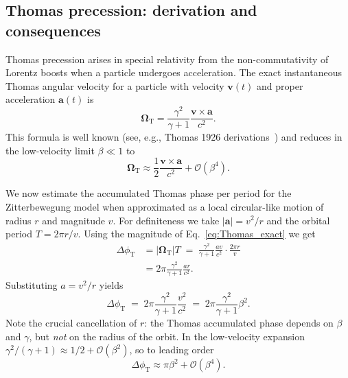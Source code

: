 \documentclass[%
 reprint,
 amsmath,amssymb,
 aps,
]{revtex4-1}
\numberwithin{equation}{section}
\begin{document}
\subsection{Thomas precession: derivation and consequences}

Thomas precession arises in special relativity from the non-commutativity of Lorentz boosts when a particle undergoes acceleration. The exact instantaneous Thomas angular velocity for a particle with velocity $\mathbf{v}(t)$ and proper acceleration $\mathbf{a}(t)$ is
\begin{equation}
\boldsymbol{\Omega}_{\mathrm{T}} = \frac{\gamma^{2}}{\gamma+1}\frac{\mathbf{v}\times\mathbf{a}}{c^{2}}.
\label{eq:Thomas_exact}
\end{equation}
This formula is well known (see, e.g., Thomas 1926 derivations~\cite{thomas1926}) and reduces in the low-velocity limit $\beta\ll1$ to
\begin{equation}
\boldsymbol{\Omega}_{\mathrm{T}}\approx \frac{1}{2}\frac{\mathbf{v}\times\mathbf{a}}{c^{2}}+\mathcal{O}(\beta^{4}).
\label{eq:Thomas_low}
\end{equation}

We now estimate the accumulated Thomas phase per period for the Zitterbewegung model when approximated as a local circular-like motion of radius $r$ and magnitude $v$. For definiteness we take $|\mathbf{a}|=v^{2}/r$ and the orbital period $T=2\pi r/v$. Using the magnitude of Eq.~\eqref{eq:Thomas_exact} we get
\begin{align}
\Delta\phi_{\mathrm{T}} &= \left|\boldsymbol{\Omega}_{\mathrm{T}}\right| T
\;=\; \frac{\gamma^{2}}{\gamma+1}\frac{a v}{c^{2}}\cdot\frac{2\pi r}{v}
\nonumber\\
&= 2\pi\frac{\gamma^{2}}{\gamma+1}\frac{a r}{c^{2}}.
\label{eq:DeltaPhiT_general}
\end{align}
Substituting $a=v^{2}/r$ yields
\begin{equation}
\Delta\phi_{\mathrm{T}} \;=\; 2\pi\frac{\gamma^{2}}{\gamma+1}\frac{v^{2}}{c^{2}}
\;=\; 2\pi\frac{\gamma^{2}}{\gamma+1}\beta^{2}.
\label{eq:DeltaPhiT_simplified}
\end{equation}
Note the crucial cancellation of $r$: the Thomas accumulated phase depends on $\beta$ and $\gamma$, but \emph{not} on the radius of the orbit. In the low-velocity expansion $\gamma^{2}/(\gamma+1)\approx 1/2+\mathcal{O}(\beta^{2})$, so to leading order
\begin{equation}
\Delta\phi_{\mathrm{T}}\approx \pi\beta^{2} + \mathcal{O}(\beta^{4}).
\label{eq:DeltaPhiT_lowbeta}
\end{equation}
\end{document}
